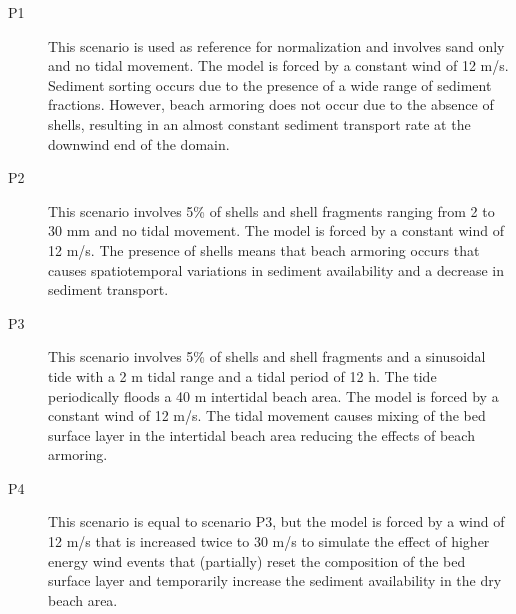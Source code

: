 \begin{description}
\item[P1] This scenario is used as reference for normalization and
  involves sand only and no tidal movement. The model is forced by a
  constant wind of 12 m/s. Sediment sorting occurs due to the presence
  of a wide range of sediment fractions. However, beach armoring does
  not occur due to the absence of shells, resulting in an almost
  constant sediment transport rate at the downwind end of the domain.
\item[P2] This scenario involves 5\% of shells and shell fragments
  ranging from 2 to 30 mm and no tidal movement. The model is forced
  by a constant wind of 12 m/s. The presence of shells means that beach
  armoring occurs that causes spatiotemporal variations in sediment
  availability and a decrease in sediment transport.
\item[P3] This scenario involves 5\% of shells and shell fragments and
  a sinusoidal tide with a 2 m tidal range and a tidal period of 12
  h. The tide periodically floods a 40 m intertidal beach area. The
  model is forced by a constant wind of 12 m/s. The tidal movement
  causes mixing of the bed surface layer in the intertidal beach area
  reducing the effects of beach armoring.
\item[P4] This scenario is equal to scenario P3, but the model is
  forced by a wind of 12 m/s that is increased twice to 30 m/s to
  simulate the effect of higher energy wind events that (partially)
  reset the composition of the bed surface layer and temporarily
  increase the sediment availability in the dry beach area.
\end{description}

